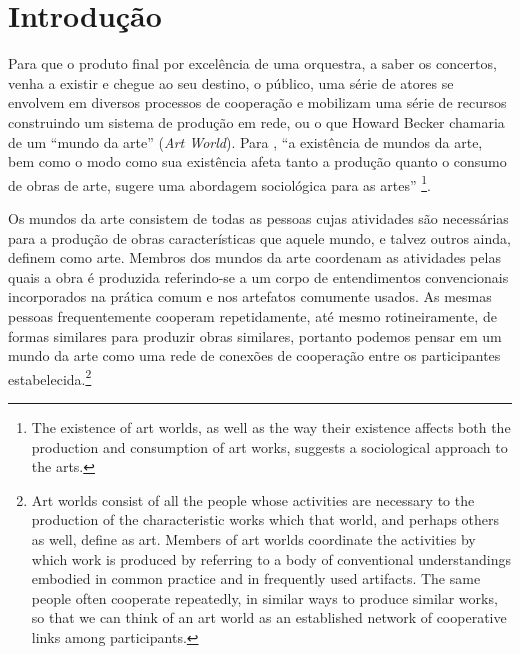 \documentclass[a4paper, 12pt, openright, oneside, german, french, english, brazil]{abntex2}
\begin{document}
	\listoffigures
	\listoftables	
	\newpage
	\tableofcontents
	\textual
	
	\chapter*[Introdução]{Introdução}
	
	Para que o produto final por excelência de uma orquestra, a saber os concertos, venha a existir e chegue ao seu destino, o público, uma série de atores se envolvem em diversos processos de cooperação e mobilizam uma série de recursos construindo um sistema de produção em rede, ou o que Howard Becker chamaria de um ``mundo da arte'' (\textit{Art World}). Para , ``a existência de mundos da arte, bem como o modo como sua existência afeta tanto a produção quanto o consumo de obras de arte, sugere uma abordagem sociológica para as artes'' \footnote{The existence of art worlds, as well as the way their existence affects both the production and consumption of art works, suggests a sociological approach to the arts.}.
	
	\begin{citacao}
		Os mundos da arte consistem de todas as pessoas cujas atividades são necessárias para a produção de obras características que aquele mundo, e talvez outros ainda, definem como arte. Membros dos mundos da arte coordenam as atividades pelas quais a obra é produzida referindo-se a um corpo de entendimentos convencionais incorporados na prática comum e nos artefatos comumente usados. As mesmas pessoas frequentemente cooperam repetidamente, até mesmo rotineiramente, de formas similares para produzir obras similares, portanto podemos pensar em um mundo da arte como uma rede de conexões de cooperação entre os participantes estabelecida.\footnote{Art worlds consist of all the people whose activities are necessary to the production of the characteristic works which that world, and perhaps others as well, define as art. Members of art worlds coordinate the activities by which work is produced by referring to a body of conventional understandings embodied in common practice and in frequently used artifacts. The same people often cooperate repeatedly, in similar ways to produce similar works, so that we can think of an art world as an established network of cooperative links among participants.} \cite[p. 34-5]{becker2008art}
	\end{citacao}
	
\end{document}
